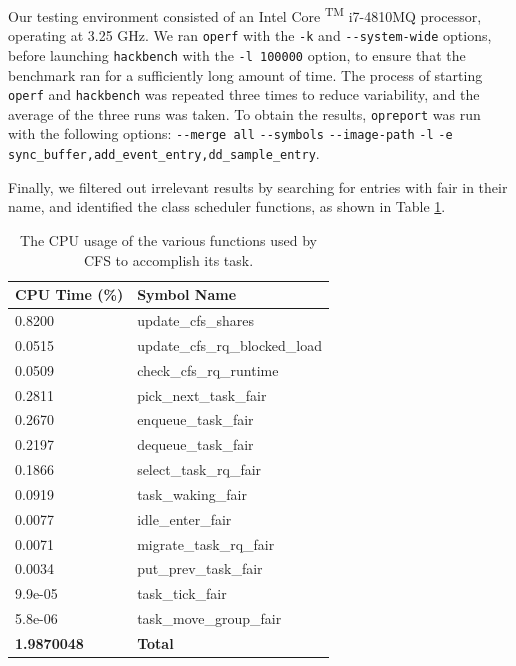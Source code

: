 \documentclass{sig-alternate-10pt}
\begin{document}
Our testing environment consisted of an Intel \textsuperscript{\textregistered} Core \textsuperscript{TM} i7-4810MQ processor, operating at 3.25 GHz. We ran \verb|operf| with the \verb|-k| and \verb|--system-wide| options, before launching \verb|hackbench| with the \verb|-l 100000| option, to ensure that the benchmark ran for a sufficiently long amount of time. The process of starting \verb|operf| and \verb|hackbench| was repeated three times to reduce variability, and the average of the three runs was taken. To obtain the results, \verb|opreport| was run with the following options: \verb|--merge all| \verb|--symbols| \verb|--image-path| \verb|-l| \verb|-e| \verb|sync_buffer,|\verb|add_event_entry,|\verb|dd_sample_entry|.

Finally, we filtered out irrelevant results by searching for entries with fair in their name, and identified the class scheduler functions, as shown in Table \ref{tab:cfs_usage}.

\begin{table}[h]
\begin{center}
	\begin{tabular}{@{}ll@{}}
		\toprule
		CPU Time (\%)      & Symbol Name                    \\ \midrule
		0.8200             & update\_cfs\_shares            \\
		0.0515             & update\_cfs\_rq\_blocked\_load \\
		0.0509             & check\_cfs\_rq\_runtime        \\
		0.2811             & pick\_next\_task\_fair         \\
		0.2670             & enqueue\_task\_fair            \\
		0.2197             & dequeue\_task\_fair            \\
		0.1866             & select\_task\_rq\_fair         \\
		0.0919             & task\_waking\_fair             \\
		0.0077             & idle\_enter\_fair              \\
		0.0071             & migrate\_task\_rq\_fair        \\
		0.0034             & put\_prev\_task\_fair          \\
		9.9e-05            & task\_tick\_fair               \\
		5.8e-06            & task\_move\_group\_fair        \\
		\textbf{1.9870048} & \textbf{Total}                 \\ \bottomrule
	\end{tabular}
	\caption{The CPU usage of the various functions used by CFS to accomplish its task.}
	\label{tab:cfs_usage}
\end{center}
\end{table}
\end{document}
